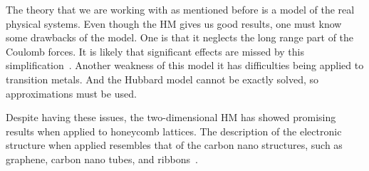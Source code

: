 The theory that we are working with as mentioned before is a model of the real physical systems. Even though the HM gives us good results, one must know some drawbacks of the model. One is that it neglects the long range part of the Coulomb forces. It is likely that significant effects are missed by this simplification~\cite{mott}. Another weakness of this model it has difficulties being applied to transition metals. And the Hubbard model cannot be exactly solved, so approximations must be used.

Despite having these issues, the two-dimensional HM has showed promising results when applied to honeycomb lattices. The description of the electronic structure when applied resembles that of the carbon nano structures, such as graphene, carbon nano tubes, and ribbons~\cite{graphhmc}.

